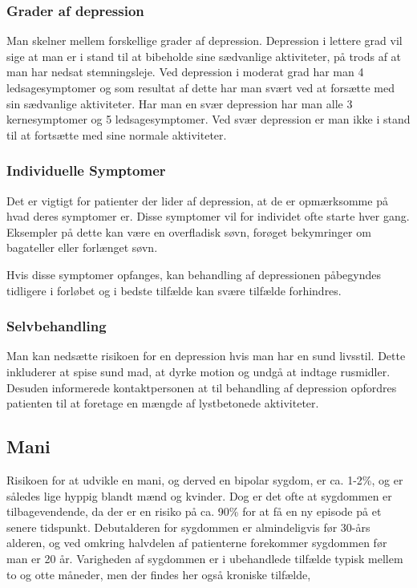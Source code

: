 \subsubsection{Grader af depression}
Man skelner mellem forskellige grader af depression.
Depression i lettere grad vil sige at man er i stand til at bibeholde sine sædvanlige aktiviteter, på trods af at man har nedsat stemningsleje.
Ved depression i moderat grad har man 4 ledsagesymptomer og som resultat af dette har man svært ved at forsætte med sin sædvanlige aktiviteter.
Har man en svær depression har man alle 3 kernesymptomer og 5 ledsagesymptomer.
Ved svær depression er man ikke i stand til at fortsætte med sine normale aktiviteter.

\subsubsection{Individuelle Symptomer}
Det er vigtigt for patienter der lider af depression, at de er opmærksomme på hvad deres symptomer er.
Disse symptomer vil for individet ofte starte hver gang.
Eksempler på dette kan være en overfladisk søvn, forøget bekymringer om bagateller eller forlænget søvn.

Hvis disse symptomer opfanges, kan behandling af depressionen påbegyndes tidligere i forløbet og i bedste tilfælde kan svære tilfælde forhindres.
\subsubsection{Selvbehandling}
Man kan nedsætte risikoen for en depression hvis man har en sund livsstil.
Dette inkluderer at spise sund mad, at dyrke motion og undgå at indtage rusmidler.
Desuden informerede kontaktpersonen \citet{misc:janne-rasmussen} at til behandling af depression opfordres patienten til at foretage en mængde af lystbetonede aktiviteter.

\subsection{Mani}
Risikoen for at udvikle en mani, og derved en bipolar sygdom, er ca. 1-2\%, og er således lige hyppig blandt mænd og kvinder.
Dog er det ofte at sygdommen er tilbagevendende, da der er en risiko på ca. 90\% for at få en ny episode på et senere tidspunkt.
Debutalderen for sygdommen er almindeligvis før 30-års alderen, og ved omkring halvdelen af patienterne forekommer sygdommen før man er 20 år.
Varigheden af sygdommen er i ubehandlede tilfælde typisk mellem to og otte måneder, men der findes her også kroniske tilfælde,

